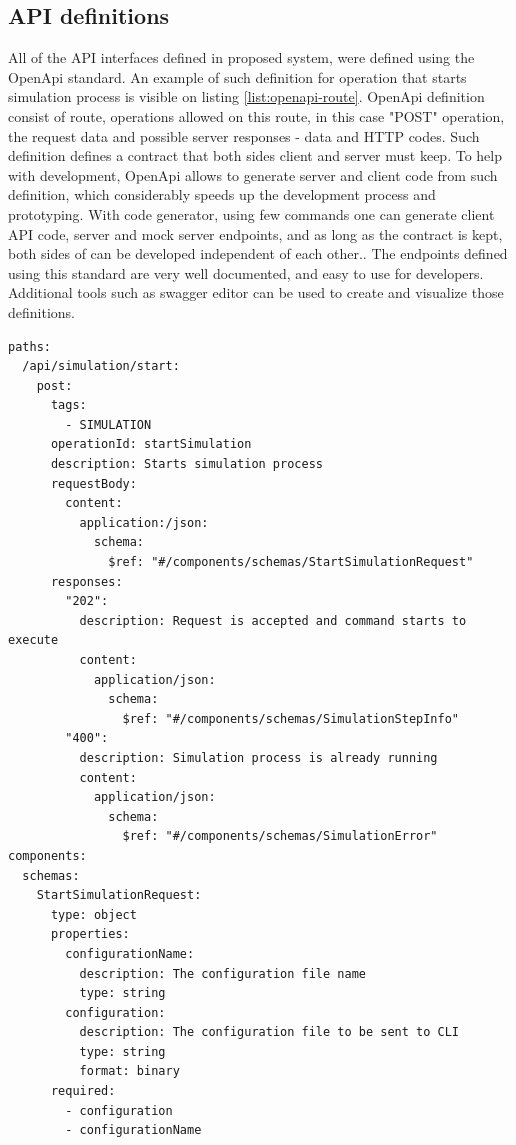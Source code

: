 \subsection{API definitions}
All of the API interfaces defined in proposed system, were defined using the OpenApi standard. An example of such definition for operation that starts simulation process is visible on listing \ref{list:openapi-route}. OpenApi definition consist of route, operations allowed on this route, in this case "POST" operation, the request data and possible server responses - data and HTTP codes. Such definition defines a contract that both sides client and server must keep. To help with development, OpenApi allows to generate server and client code from such definition, which considerably speeds up the development process and prototyping. With code generator, using few commands one can generate client API code, server and mock server endpoints, and as long as the contract is kept, both sides of can be developed independent of each other.. The endpoints defined using this standard are very well documented, and easy to use for developers. Additional tools such as swagger editor can be used to create and visualize those definitions. 

\begin{lstlisting}[label=list:openapi-route,caption=The OpenAPI route definition for simulation start, basicstyle=\footnotesize\ttfamily]
paths:
  /api/simulation/start:
    post:
      tags:
        - SIMULATION
      operationId: startSimulation
      description: Starts simulation process
      requestBody:
        content:
          application:/json:
            schema:
              $ref: "#/components/schemas/StartSimulationRequest"
      responses:
        "202":
          description: Request is accepted and command starts to execute
          content:
            application/json:
              schema:
                $ref: "#/components/schemas/SimulationStepInfo"
        "400":
          description: Simulation process is already running
          content:
            application/json:
              schema:
                $ref: "#/components/schemas/SimulationError"
components:
  schemas:
    StartSimulationRequest:
      type: object
      properties:
        configurationName:
          description: The configuration file name
          type: string
        configuration:
          description: The configuration file to be sent to CLI
          type: string
          format: binary
      required:
        - configuration
        - configurationName
\end{lstlisting}
